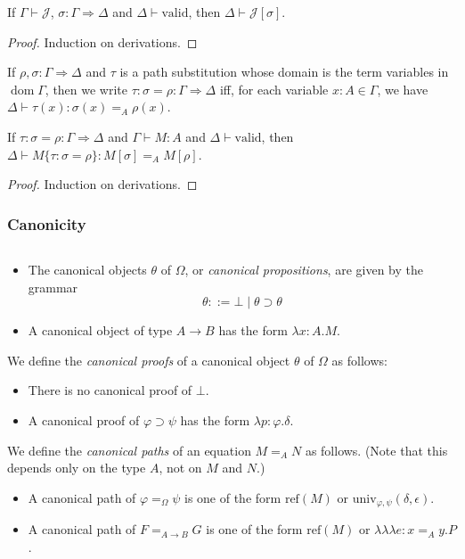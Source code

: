 \documentclass[a4paper,UKenglish]{lipics-v2016}
\newcommand*{\reff}[1]{\ensuremath{\mathrm{ref} \left( {#1} \right)}}
\newcommand*{\univ}[4]{\ensuremath{\mathrm{univ}_{{#1}, {#2}} \left({#3} , {#4} \right)}}
\newcommand*{\triplelambda}{\ensuremath{\lambda \!\! \lambda \!\! \lambda}}
\newcommand*{\vald}{\ensuremath{\vdash \mathrm{valid}}}
\newcommand*{\dom}{\ensuremath{\operatorname{dom}}}
\theoremstyle{plain}
\theoremstyle{definition}
\begin{document}
\begin{lemma}
If $\Gamma \vdash \mathcal{J}$, $\sigma : \Gamma \Rightarrow \Delta$ and $\Delta \vald$, then $\Delta \vdash \mathcal{J} [\sigma]$.
\end{lemma}

\begin{proof}
Induction on derivations.
\end{proof}

\begin{definition}
If $\rho, \sigma : \Gamma \Rightarrow \Delta$ and $\tau$ is a path substitution whose domain
is the term variables in $\dom \Gamma$, then we write
$\tau : \sigma = \rho : \Gamma \Rightarrow \Delta$ iff, for each variable $x : A \in \Gamma$, we have
$\Delta \vdash \tau(x) : \sigma(x) =_A \rho(x)$.
\end{definition}

\begin{lemma}
\label{lm:pathsub}
If $\tau : \sigma = \rho : \Gamma \Rightarrow \Delta$ and $\Gamma \vdash M : A$ and $\Delta \vald$,
then $\Delta \vdash M \{ \tau : \sigma = \rho \} : M [ \sigma ] =_A M [ \rho ]$.
\end{lemma}

\begin{proof}
Induction on derivations.
\end{proof}

\subsubsection{Canonicity}

\begin{definition}
$ $
\begin{itemize}
\item
The canonical objects $\theta$ of $\Omega$, or \emph{canonical propositions}, are given by the grammar
$$ \theta ::= \bot \mid \theta \supset \theta $$
\item
A canonical object of type $A \rightarrow B$ has the form $\lambda x:A.M$.
\end{itemize}
We define the \emph{canonical proofs} of a canonical object $\theta$ of $\Omega$ as follows:
\begin{itemize}
\item
There is no canonical proof of $\bot$.
\item
A canonical proof of $\varphi \supset \psi$ has the form $\lambda p : \varphi . \delta$.
\end{itemize}
We define the \emph{canonical paths} of an equation $M =_A N$ as follows.  (Note that this depends only on the type $A$, not on $M$ and $N$.)
\begin{itemize}
\item
A canonical path of $\varphi =_\Omega \psi$ is one of the form $\reff{M}$ or $\univ{\varphi}{\psi}{\delta}{\epsilon}$.
\item
A canonical path of $F =_{A \rightarrow B} G$ is one of the form $\reff{M}$ or $\triplelambda e:x =_A y. P$.
\end{itemize}
\end{definition}
\end{document}
